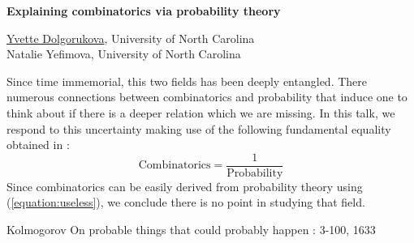 \documentclass[a4paper, 11pt]{article}
\newcommand{\abstracttitle}[1]{{
    \centering
    \LARGE \textbf{#1}\\
    \vspace*{0.7cm}
}}
\newcommand{\firstauthor}[2]{{
    \centering
    \underline{#1}, \textsf{#2}\\
    \vspace*{0.25cm}
}}
\newcommand{\otherauthor}[2]{{
    \centering
    #1, \textsf{#2}\\
    \vspace*{0.25cm}
}}
\newcommand{\abstracttext}[1]{
    \vspace{0.6cm}
    #1
}
\begin{document}
\abstracttitle{Explaining combinatorics via probability theory}

\firstauthor{Yvette Dolgorukova}{University of North Carolina}
\otherauthor{Natalie Yefimova}{University of North Carolina}

\abstracttext{
    Since time immemorial, this two fields has been deeply entangled. There numerous connections between combinatorics and probability that induce one to think about if there is a deeper relation which we are missing. In this talk, we respond to this uncertainty making use of the following fundamental equality obtained in \cite{kolmogorov}:
    \begin{equation} \label{equation:useless}
        \text{Combinatorics} = \frac{1}{\text{Probability}}
    \end{equation}
    Since combinatorics can be easily derived from probability theory using (\ref{equation:useless}), we conclude there is no point in studying that field.
}

\begin{thebibliography}{9}
Kolmogorov
\newblock On probable things that could probably happen
: 3-100, 1633
\end{thebibliography}
\end{document}
